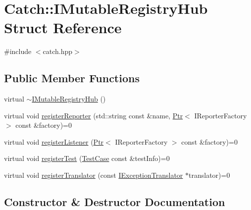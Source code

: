 \hypertarget{struct_catch_1_1_i_mutable_registry_hub}{}\section{Catch\+:\+:I\+Mutable\+Registry\+Hub Struct Reference}
\label{struct_catch_1_1_i_mutable_registry_hub}


{\ttfamily \#include $<$catch.\+hpp$>$}

\subsection*{Public Member Functions}
\begin{DoxyCompactItemize}
\item 
virtual \hyperlink{struct_catch_1_1_i_mutable_registry_hub_a759ca1e044e19f905fb4d306f1367193}{$\sim$\+I\+Mutable\+Registry\+Hub} ()
\item 
virtual void \hyperlink{struct_catch_1_1_i_mutable_registry_hub_aab72d0aa1fa14627f1a6a4c893ae0a12}{register\+Reporter} (std\+::string const \&name, \hyperlink{class_catch_1_1_ptr}{Ptr}$<$ I\+Reporter\+Factory $>$ const \&factory)=0
\item 
virtual void \hyperlink{struct_catch_1_1_i_mutable_registry_hub_ae06fcb90ba3f2b389d450cd81e229276}{register\+Listener} (\hyperlink{class_catch_1_1_ptr}{Ptr}$<$ I\+Reporter\+Factory $>$ const \&factory)=0
\item 
virtual void \hyperlink{struct_catch_1_1_i_mutable_registry_hub_a11b85c6744d88c9f83fe16ad4a8dd451}{register\+Test} (\hyperlink{class_catch_1_1_test_case}{Test\+Case} const \&test\+Info)=0
\item 
virtual void \hyperlink{struct_catch_1_1_i_mutable_registry_hub_ae6825365102693cf7707db022a2c2b49}{register\+Translator} (const \hyperlink{struct_catch_1_1_i_exception_translator}{I\+Exception\+Translator} $\ast$translator)=0
\end{DoxyCompactItemize}


\subsection{Constructor \& Destructor Documentation}
\hypertarget{struct_catch_1_1_i_mutable_registry_hub_a759ca1e044e19f905fb4d306f1367193}{}\label{struct_catch_1_1_i_mutable_registry_hub_a759ca1e044e19f905fb4d306f1367193} 
